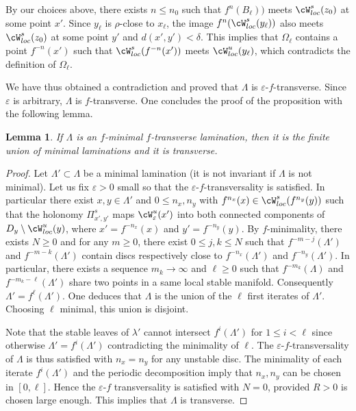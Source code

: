 \documentclass[a4paper,11pt]{amsart}
\numberwithin{equation}{section}     %
\newtheorem{lema}[teo]{Lemma}
\theoremstyle{definition}
\theoremstyle{remark}
\newcommand{\eps}{\varepsilon}
\begin{document}
By our choices above, there exists $n\leq n_0$ such that $f^n(B_\ell))$ meets $\cW^s_{loc}(z_0)$ at some point $x'$.
Since $y_\ell$ is $\rho$-close to $x_\ell$, the image $f^n(\cW^s_{loc}(y_\ell))$ also meets $\cW^s_{loc}(z_0)$ at some point $y'$
and $d(x',y')<\delta$. This implies that $\Omega_\ell$ contains a point $f^{-n}(x')$ such that
$\cW^s_{loc}(f^{-n}(x'))$ meets $\cW^u_{loc}(y_{\ell})$, which contradicts the definition of $\Omega_\ell$.

We have thus obtained a contradiction and proved that $\Lambda$ is $\varepsilon$-$f$-transverse.
Since $\varepsilon$ is arbitrary, $\Lambda$ is $f$-transverse. One concludes the proof of the proposition with the following lemma.

\begin{lema}
If $\Lambda$ is an $f$-minimal $f$-transverse lamination, then it is the finite union of minimal laminations and it is transverse.
\end{lema}
\begin{proof}

Let $\Lambda'\subset \Lambda$ be a minimal lamination (it is not invariant if $\Lambda$ is not minimal).
Let us fix $\varepsilon>0$ small so that the $\varepsilon$-$f$-transversality is satisfied.
In particular there exist $x,y\in \Lambda'$ and $0\leq n_x,n_y$ with $f^{n_x}(x)\in \cW^s_{loc}(f^{n_y}(y))$
such that the holonomy $\Pi^s_{x',y'}$ maps $\cW^u_\varepsilon(x')$ into both connected components of $D_y\setminus \cW^u_{loc}(y)$, where $x'=f^{-n_x}(x)$ and $y'=f^{-n_y}(y)$. By $f$-minimality, there exists $N\geq 0$ and
for any $m\geq 0$, there exist $0\leq j,k \leq N$ such that $f^{-m-j}(\Lambda')$ and $f^{-m-k}(\Lambda')$
contain discs respectively close to $f^{-n_x}(\Lambda')$ and $f^{-n_y}(\Lambda')$.
In particular, there exists a sequence $m_k\to\infty$ and $\ell\geq 0$ such that
$f^{-m_k}(\Lambda)$ and $f^{-m_k-\ell}(\Lambda')$ share two points in a same local stable manifold.
Consequently $\Lambda'=f^\ell(\Lambda')$. One deduces that $\Lambda$ is the union of the $\ell$ first iterates of $\Lambda'$.
Choosing $\ell$ minimal, this union is disjoint.

Note that the stable leaves of $\lambda'$ cannot intersect $f^{i}(\Lambda')$ for $1\leq i<\ell$ since otherwise $\Lambda'=f^i(\Lambda')$ contradicting the minimality of $\ell$. The $\eps$-$f$-transversality of $\Lambda$ is thus satisfied with $n_x=n_y$ for any unstable disc. The minimality of each iterate $f^i(\Lambda')$ and the periodic decomposition imply that $n_x,n_y$ can be chosen in $[0,\ell]$. Hence the $\eps$-$f$ transversality is satisfied with $N=0$, provided $R>0$ is chosen large enough. This implies that $\Lambda$ is transverse.
\end{proof}
\end{document}
